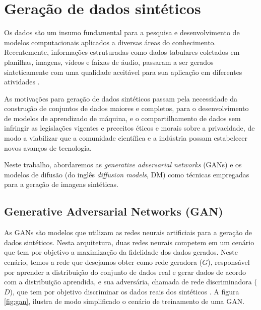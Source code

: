 \section{Geração de dados sintéticos}

Os dados são um insumo fundamental para a pesquisa e desenvolvimento de modelos computacionais aplicados a diversas áreas do conhecimento. Recentemente, informações estruturadas como dados tabulares coletados em planilhas, imagens, vídeos e faixas de áudio, passaram a ser gerados sinteticamente com uma qualidade aceitável para sua aplicação em diferentes atividades \cite{dhariwalDiffusionModelsBeat2021}.

As motivações para geração de dados sintéticos passam pela necessidade da construção de conjuntos de dados maiores e completos, para o desenvolvimento de modelos de aprendizado de máquina, e o compartilhamento de dados sem infringir as legislações vigentes e preceitos éticos e morais sobre a privacidade, de modo a viabilizar que a comunidade científica e a indústria possam estabelecer novos avanços de tecnologia.

Neste trabalho, abordaremos as \textit{generative adversarial networks} (GANs) e os modelos de difusão (do inglês \textit{diffusion models}, DM) como técnicas empregadas para a geração de imagens sintéticas.

\subsection{Generative Adversarial Networks (GAN)}

As GANs são modelos que utilizam as redes neurais artificiais para a geração de dados sintéticos. Nesta arquitetura, duas redes neurais competem em um cenário que tem por objetivo a maximização da fidelidade dos dados gerados. Neste cenário, temos a rede que desejamos obter como rede geradora ($G$), responsável por aprender a distribuição do conjunto de dados real e gerar dados de acordo com a distribuição aprendida, e sua adversária, chamada de rede discriminadora ($D$), que tem por objetivo discriminar os dados reais dos sintéticos \cite{goodfellowDeepLearning2016}. A figura \ref{fig:gan}, ilustra de modo simplificado o cenário de treinamento de uma GAN.

